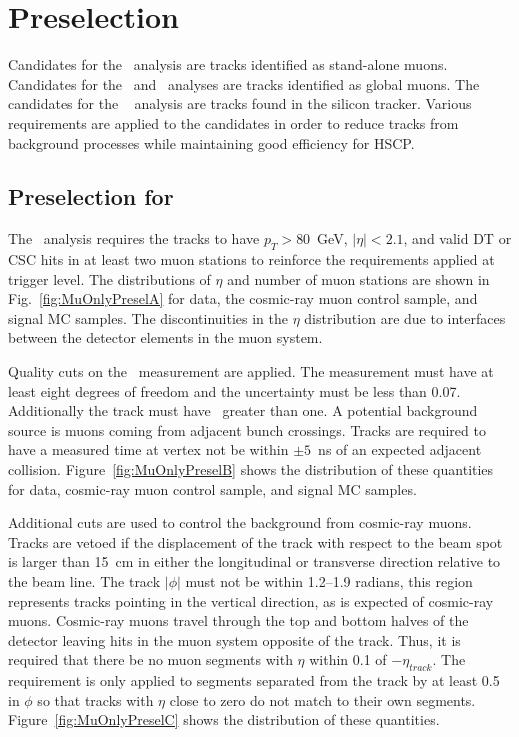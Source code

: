 \section{Preselection \label{sec:preselection}}
Candidates for the \muononly\ analysis are tracks identified as stand-alone muons. Candidates for the \tktof\ and \multi\ analyses are tracks identified
as global muons. The candidates for the \tkonly\
analysis are tracks found in the silicon tracker.
Various requirements are applied to the candidates in order to reduce tracks from background processes while maintaining good efficiency for HSCP.

\subsection{Preselection for \muononly\ \label{sec:muonlypreselection}}

The \muononly\ analysis requires the tracks to have $p_T > 80$~GeV, $|\eta| < 2.1$, and valid DT or CSC hits in at least two muon stations
to reinforce the requirements applied at trigger level. 
The distributions of $\eta$ and number of muon stations are shown in Fig.~\ref{fig:MuOnlyPreselA} for data, the cosmic-ray muon control sample, and signal MC samples.
The discontinuities in the $\eta$ distribution are due to interfaces between the detector elements in the muon system.

Quality cuts on the \invbeta\ measurement are applied. The measurement must have at least eight degrees of freedom and the uncertainty must be less than 0.07.
Additionally the track must have \invbeta\ greater than one.
A potential background source is muons coming from adjacent bunch crossings.
Tracks are required to have a measured time at vertex not be within $\pm5$~ns of an expected adjacent collision.
Figure~\ref{fig:MuOnlyPreselB} shows the distribution of these quantities for data, cosmic-ray muon control sample, and signal MC samples.

Additional cuts are used to control the background from cosmic-ray muons. Tracks are vetoed if the displacement of the track
with respect to the beam spot is larger than 15~cm in either the longitudinal or transverse direction relative to the beam line. 
The track $|\phi|$ must not be within 1.2--1.9 radians, this region represents tracks pointing in the vertical
direction, as is expected of cosmic-ray muons. Cosmic-ray muons travel 
through the top and bottom halves of the detector leaving hits in the muon system opposite of the track.
Thus, it is required that  there be no muon segments with $\eta$ within 0.1 of $-\eta_{track}$. The requirement is only applied to 
segments separated from the track by at least 0.5 in $\phi$ so that tracks with $\eta$ close to zero do not match to their own segments.
Figure~\ref{fig:MuOnlyPreselC} shows the distribution of these quantities.

